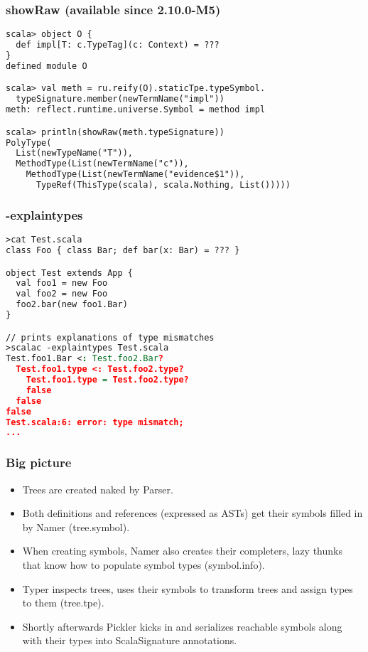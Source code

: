\documentclass[hyperref={bookmarks=false}]{beamer}
\begin{document}
\begin{frame}[fragile]
\frametitle{showRaw (available since 2.10.0-M5)}

\begin{lstlisting}[language=XML]
scala> object O {
  def impl[T: c.TypeTag](c: Context) = ???
}
defined module O

scala> val meth = ru.reify(O).staticTpe.typeSymbol.
  typeSignature.member(newTermName("impl"))
meth: reflect.runtime.universe.Symbol = method impl

scala> println(showRaw(meth.typeSignature))
PolyType(
  List(newTypeName("T")),
  MethodType(List(newTermName("c")),
    MethodType(List(newTermName("evidence$1")),
      TypeRef(ThisType(scala), scala.Nothing, List()))))
\end{lstlisting}
\end{frame}

\begin{frame}[fragile]
\frametitle{-explaintypes}

\begin{lstlisting}[language=XML]
>cat Test.scala
class Foo { class Bar; def bar(x: Bar) = ??? }

object Test extends App {
  val foo1 = new Foo
  val foo2 = new Foo
  foo2.bar(new foo1.Bar)
}

// prints explanations of type mismatches
>scalac -explaintypes Test.scala
Test.foo1.Bar <: Test.foo2.Bar?
  Test.foo1.type <: Test.foo2.type?
    Test.foo1.type = Test.foo2.type?
    false
  false
false
Test.scala:6: error: type mismatch;
...
\end{lstlisting}
\end{frame}

\begin{frame}[fragile]
\frametitle{Big picture}

\begin{itemize}
\item Trees are created naked by Parser.
\item Both definitions and references (expressed as ASTs) get their symbols filled in by Namer (tree.symbol).
\item When creating symbols, Namer also creates their completers, lazy thunks that know how to populate symbol types (symbol.info).
\item Typer inspects trees, uses their symbols to transform trees and assign types to them (tree.tpe).
\item Shortly afterwards Pickler kicks in and serializes reachable symbols along with their types into ScalaSignature annotations.
\end{itemize}
\end{frame}
\end{document}
